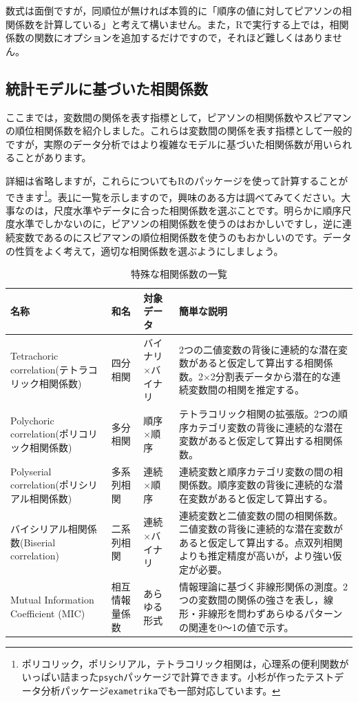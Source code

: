 \documentclass{ltjsbook}
\begin{document}
数式は面倒ですが，同順位が無ければ本質的に「順序の値に対してピアソンの相関係数を計算している」と考えて構いません。また，Rで実行する上では，相関係数の関数にオプションを追加するだけですので，それほど難しくはありません。

\subsection{統計モデルに基づいた相関係数}
ここまでは，変数間の関係を表す指標として，ピアソンの相関係数やスピアマンの順位相関係数を紹介しました。これらは変数間の関係を表す指標として一般的ですが，実際のデータ分析ではより複雑なモデルに基づいた相関係数が用いられることがあります。

詳細は省略しますが，これらについてもRのパッケージを使って計算することができます\footnote{ポリコリック，ポリシリアル，テトラコリック相関は，心理系の便利関数がいっぱい詰まった\verb|psych|パッケージで計算できます。小杉が作ったテストデータ分析パッケージ\verb|exametrika|でも一部対応しています。}。表\ref{tbl:06_07}に一覧を示しますので，興味のある方は調べてみてください。大事なのは，尺度水準やデータに合った相関係数を選ぶことです。明らかに順序尺度水準でしかないのに，ピアソンの相関係数を使うのはおかしいですし，逆に連続変数であるのにスピアマンの順位相関係数を使うのもおかしいのです。データの性質をよく考えて，適切な相関係数を選ぶようにしましょう。


\begin{table}[ht]
  \centering
  \caption{特殊な相関係数の一覧}
  \begin{tabular}{p{3.5cm}p{2cm}p{2cm}p{5.5cm}}
    \toprule
    \textbf{名称} & \textbf{和名} & \textbf{対象データ} & \textbf{簡単な説明} \\
    \midrule
     Tetrachoric correlation(テトラコリック相関係数) & 四分相関 & バイナリ$\times$バイナリ & 2つの二値変数の背後に連続的な潜在変数があると仮定して算出する相関係数。2$\times$2分割表データから潜在的な連続変数間の相関を推定する。 \\
    \addlinespace
     Polychoric correlation(ポリコリック相関係数) & 多分相関 & 順序$\times$順序 & テトラコリック相関の拡張版。2つの順序カテゴリ変数の背後に連続的な潜在変数があると仮定して算出する相関係数。 \\
    \addlinespace
     Polyserial correlation(ポリシリアル相関係数) & 多系列相関 & 連続$\times$順序 & 連続変数と順序カテゴリ変数の間の相関係数。順序変数の背後に連続的な潜在変数があると仮定して算出する。 \\
    \addlinespace
    バイシリアル相関係数(Biserial correlation)  & 二系列相関 & 連続$\times$バイナリ & 連続変数と二値変数の間の相関係数。二値変数の背後に連続的な潜在変数があると仮定して算出する。点双列相関よりも推定精度が高いが，より強い仮定が必要。 \\
    \addlinespace
    Mutual Information Coefficient (MIC) & 相互情報量係数 & あらゆる形式 & 情報理論に基づく非線形関係の測度。2つの変数間の関係の強さを表し，線形・非線形を問わずあらゆるパターンの関連を0〜1の値で示す。 \\
    \bottomrule
  \end{tabular}
  \label{tbl:06_07}
\end{table}
\end{document}
